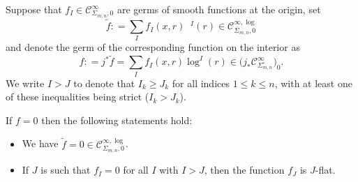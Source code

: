\documentclass[10pt]{amsart}
\theoremstyle{definition}
\theoremstyle{remark}
\renewcommand{\le}{\leqslant}
\renewcommand{\ge}{\geqslant}
\newcommand{\ulog}{\mathop{\widetilde{\log}}\nolimits}
\newcommand{\uf}{\widetilde{f}}
\newcommand{\defas}{\mathrel{\mathop:}=}
\newcommand{\Cinf}[1]{\mathscr{C}^{\infty}_{#1}}
\newcommand{\Cinflog}[1]{\mathscr{C}^{\infty,\log}_{#1}}
\newcommand{\Sig}{\Sigma}
\newcommand{\intSig}{\Sigma^\circ}
\begin{document}
\begin{proposition}\label{prop:j^*-injective-induction}
Suppose that $f_{I} \in \Cinf{\Sig_{m,n},0}$ are germs of smooth functions at the origin, set
\[
\uf \defas \sum_{I} f_{I}(x,r)\ulog{}\!^I(r)
\in \Cinflog{\Sig_{m,n},0}
\]
and denote the germ of the corresponding function on the interior as
\[
f \defas j^*\uf = \sum_{I} f_{I}(x,r)\log^I(r)
\in \big(j_*\Cinf{\intSig_{m,n}}\big)_0
.
\]
We write $I>J$ to denote that $I_k\ge J_k$ for all indices $1\le k \le n$, with at least one of these inequalities being strict ($I_k > J_k$).

If $f=0$ then the following statements hold:
\begin{itemize}
\item[$(\alpha)$] We have $\uf = 0 \in \Cinflog{\Sig_{m,n},0}$.
\item[$(\beta)$] If $J$ is such that $f_I=0$ for all $I$ with $I>J$, then the function $f_{J}$ is $J$-flat.
\end{itemize}
\end{proposition}
\end{document}
